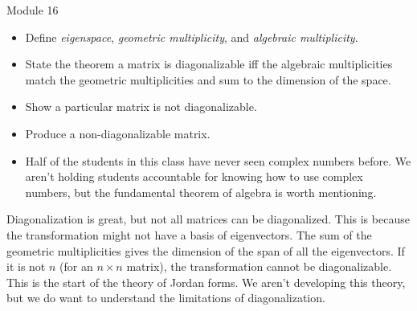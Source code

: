 \begin{lesson}

	Module 16

	\begin{itemize}
		\item Define \emph{eigenspace}, \emph{geometric multiplicity}, and \emph{algebraic multiplicity}.
		\item State the theorem a matrix is diagonalizable iff the algebraic multiplicities match the geometric
			multiplicities and sum to the dimension of the space.
		\item Show a particular matrix is not diagonalizable.
		\item Produce a non-diagonalizable matrix.
	\end{itemize}

	\begin{annotation}
		\begin{notes}
			\begin{itemize}
				\item Half of the students in this class have never seen complex
					numbers before. We aren't holding students accountable
					for knowing how to use complex numbers, but the fundamental
					theorem of algebra is worth mentioning.
			\end{itemize}
		\end{notes}
	\end{annotation}
	Diagonalization is great, but not all matrices can be diagonalized. This is because the transformation might not
	have a basis of eigenvectors. The sum of the geometric multiplicities gives the dimension of the span
	of all the eigenvectors. If it is not $n$ (for an $n\times n$ matrix), the transformation cannot be diagonalizable.
	This is the start of the theory of Jordan forms. We aren't developing this theory, but we do want to understand
	the limitations of diagonalization.

\end{lesson}

	\bookonlynewpage

